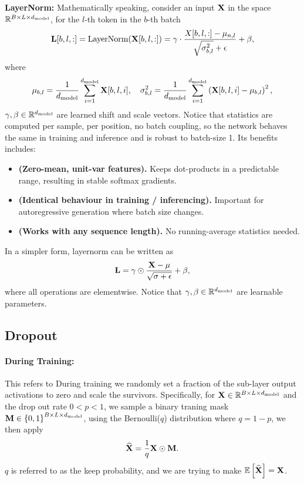 \documentclass[11pt]{article}  %
\begin{document}
\textbf{LayerNorm:} Mathematically speaking, consider an input $\mathbf{X}$ in the space $\mathbb{R}^{B \times L \times d_{\text{model}}}$, for the $l$-th token in the $b$-th batch
\begin{align*}
  \mathbf{L}[b, l, :] = \text{LayerNorm}(\mathbf{X}[b, l, :]) = \gamma \cdot \frac{X[b, l, :] - \mu_{n, l}}{\sqrt{\sigma^2_{b, l}} + \epsilon} + \beta, 
\end{align*}
where 
\begin{align*}
  \mu_{b, l} = \frac{1}{d_{\text{model}}}\sum_{i=1}^{d_{\text{model}}}\mathbf{X}[b, l, i], \quad \sigma^2_{b, l} = \frac{1}{d_{\text{model}}}\sum_{i=1}^{d_{\text{model}}}\left( \mathbf{X}[b, l, i] - \mu_{b, l} \right)^2,
\end{align*}
$\gamma, \beta \in \mathbb{R}^{d_{\text{model}}}$ are learned shift and scale vectors.
Notice that statistics are computed per sample, per position, no batch coupling, so the network behaves the same in training and inference and is robust to batch-size 1. 
Its benefits includes: 
\begin{itemize}
  \item {\bf (Zero-mean, unit-var features).} Keeps dot-products in a predictable range, resulting in stable softmax gradients.
  \item {\bf (Identical behaviour in training / inferencing).} Important for autoregressive generation where batch size changes.
  \item {\bf (Works with any sequence length).} No running-average statistics needed.
\end{itemize}
In a simpler form, layernorm can be written as 
\begin{align*}
  \mathbf{L} = \gamma \odot \frac{\mathbf{X} - \mu}{\sqrt{\sigma + \epsilon}} + \beta,
\end{align*}
where all operations are elementwise.
Notice that $\gamma, \beta \in \mathbb{R}^{d_{\text{model}}}$ are learnable parameters.


\subsection{Dropout}
\paragraph{During Training:}
This refers to During training we randomly set a fraction of the sub-layer output activations to zero and scale the survivors.
Specifically, for $\mathbf{X} \in \mathbb{R}^{B \times L \times d_{\text{model}}}$ and the drop out rate $0 < p < 1$, we sample a binary traning mask $\mathbf{M} \in \left\{ 0, 1 \right\}^{B \times L \times d_{\text{model}}}$, using the Bernoulli($q$) distribution where $q = 1 - p$, we then apply 
\begin{align*}
  \widehat{\mathbf{X}} = \frac{1}{q}\mathbf{X} \odot \mathbf{M}.
\end{align*}
$q$ is referred to as the keep probability, and we are trying to make $\mathbb{E}\left[\widehat{\mathbf{X}}\right] = \mathbf{X}$.
\end{document}
